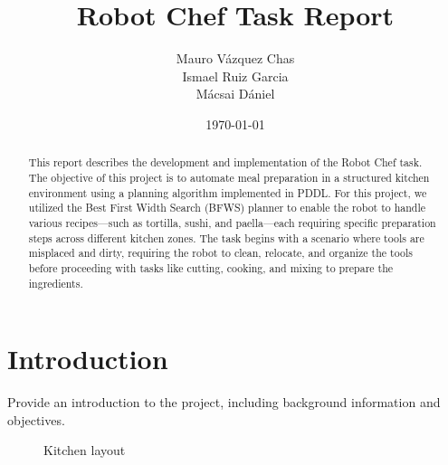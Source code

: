 \documentclass[a4paper,12pt]{article}
\title{Robot Chef Task Report}
\author{Mauro Vázquez Chas \\
Ismael Ruiz Garcia \\
Mácsai Dániel
}
\date{\today}
\begin{document}
\maketitle

\begin{abstract}
    This report describes the development and implementation of the Robot Chef task. The objective of this project is to automate meal preparation in a structured kitchen environment using a planning algorithm implemented in PDDL. For this project, we utilized the Best First Width Search (BFWS) planner to enable the robot to handle various recipes—such as tortilla, sushi, and paella—each requiring specific preparation steps across different kitchen zones. The task begins with a scenario where tools are misplaced and dirty, requiring the robot to clean, relocate, and organize the tools before proceeding with tasks like cutting, cooking, and mixing to prepare the ingredients.
\end{abstract}

\tableofcontents

\section{Introduction}
\label{sec:introduction}
Provide an introduction to the project, including background information and objectives.
\begin{wrapfigure}{r}{0.5\textwidth}
    \centering
    \caption{Kitchen layout}
    \label{fig:kitchen_layout}
\end{wrapfigure}
\end{document}
